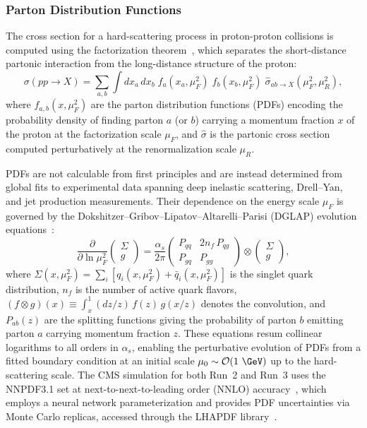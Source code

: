 \subsubsection*{Parton Distribution Functions}

The cross section for a hard-scattering process in proton-proton collisions is computed using the factorization theorem~\cite{Collins:1989gx}, which separates the short-distance partonic interaction from the long-distance structure of the proton:
\begin{equation}
\sigma(pp \to X) = \sum_{a,b} \int dx_a\, dx_b\; f_a(x_a, \mu_F^2)\; f_b(x_b, \mu_F^2)\; \hat{\sigma}_{ab \to X}(\mu_F^2, \mu_R^2),
\label{eq:factorization}
\end{equation}
where $f_{a,b}(x, \mu_F^2)$ are the parton distribution functions (PDFs) encoding the probability density of finding parton $a$ (or $b$) carrying a momentum fraction $x$ of the proton at the factorization scale $\mu_F$, and $\hat{\sigma}$ is the partonic cross section computed perturbatively at the renormalization scale $\mu_R$.

PDFs are not calculable from first principles and are instead determined from global fits to experimental data spanning deep inelastic scattering, Drell--Yan, and jet production measurements. Their dependence on the energy scale $\mu_F$ is governed by the Dokshitzer--Gribov--Lipatov--Altarelli--Parisi (DGLAP) evolution equations~\cite{Dokshitzer:1977sg, Gribov:1972ri, Altarelli:1977zs}:
\begin{equation}
  \frac{\partial}{\partial \ln\mu_F^2}
  \begin{pmatrix} \Sigma \\ g \end{pmatrix}
  = \frac{\alpha_s}{2\pi}
  \begin{pmatrix} P_{qq} & 2n_f\, P_{qg} \\ P_{gq} & P_{gg} \end{pmatrix}
  \otimes
  \begin{pmatrix} \Sigma \\ g \end{pmatrix},
  \label{eq:dglap}
\end{equation}
where $\Sigma(x,\mu_F^2) = \sum_i [q_i(x,\mu_F^2) + \bar{q}_i(x,\mu_F^2)]$ is the singlet quark distribution, $n_f$ is the number of active quark flavors, $(f \otimes g)(x) \equiv \int_x^1 (dz/z)\, f(z)\, g(x/z)$ denotes the convolution, and $P_{ab}(z)$ are the splitting functions giving the probability of parton $b$ emitting parton $a$ carrying momentum fraction $z$. These equations resum collinear logarithms to all orders in $\alpha_s$, enabling the perturbative evolution of PDFs from a fitted boundary condition at an initial scale $\mu_0 \sim \mathcal{O}(1\ \GeV)$ up to the hard-scattering scale. The CMS simulation for both Run~2 and Run~3 uses the NNPDF3.1 set at next-to-next-to-leading order (NNLO) accuracy~\cite{NNPDF:2017mvq}, which employs a neural network parameterization and provides PDF uncertainties via Monte Carlo replicas, accessed through the \textsc{LHAPDF} library~\cite{Buckley:2014ana}.

